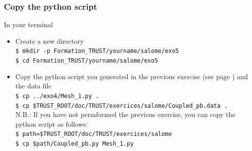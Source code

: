\documentclass[10pt, hyperref={unicode=true,pdfusetitle, bookmarks=true,bookmarksnumbered=false,bookmarksopen=false, breaklinks=false,pdfborder={0 0l 1},backref=true,colorlinks=true,linkcolor=darkblue,pageanchor}]{beamer}
\begin{document}
\begin{frame}
\frametitle{Copy the python script}

\begin{block}{In your terminal}
\begin{itemize}
 \item Create a new directory\\
 \texttt{\$ mkdir -p Formation\_TRUST/yourname/salome/exo5}\\
 \texttt{\$ cd Formation\_TRUST/yourname/salome/exo5}

 \item Copy the python script you generated in the previous exercise (see page \pageref{salomecoupledpb}) and the data file\\
 \texttt{\$ cp ../exo4/Mesh\_1.py .}\\
 \texttt{\$ cp \$TRUST\_ROOT/doc/TRUST/exercices/salome/Coupled\_pb.data .}\\
N.B.: If you have not permformed the previous exercise, you can copy the python script as follows:\\
 \texttt{\$ path=\$TRUST\_ROOT/doc/TRUST/exercices/salome}\\
 \texttt{\$ cp \$path/Coupled\_pb.py Mesh\_1.py}\\
\end{itemize}
\end{block}

\end{frame}
\end{document}
